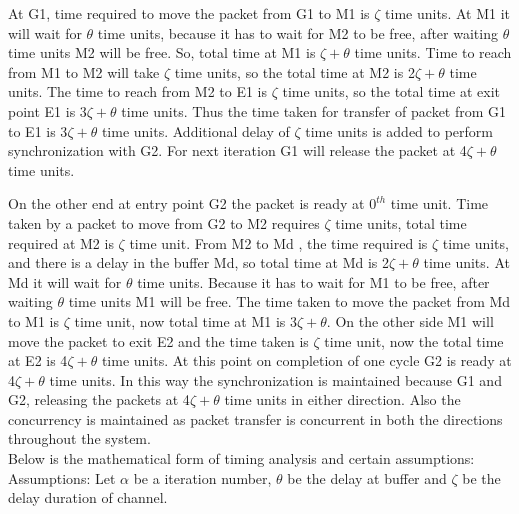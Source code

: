 \documentclass[letterpaper]{article}
\begin{document}
At G1, time required to move the packet from G1 to M1 is $\zeta$ time units. At M1 it will wait for $\theta$ time units, because it has to wait for M2 to be free, after waiting $\theta$ time units M2 will be  free. So, total time at M1 is $\zeta+\theta$ time units. Time to reach from M1 to M2 will take $\zeta$ time units, so the total time at M2 is 2$\zeta+\theta$ time units.  The time to reach from M2 to E1 is $\zeta$ time units, so the total time at exit point E1 is 3$\zeta+\theta$ time units. Thus the time taken for transfer of packet from G1 to E1 is 3$\zeta+\theta$ time units. Additional delay of $\zeta$ time units is added to perform synchronization with G2. For next iteration G1 will release the packet at 4$\zeta+\theta$ time units.
\par On the other end at entry point G2 the packet is ready at $0^{th}$ time unit. Time taken by a packet to move from G2 to M2 requires $\zeta$ time units, total time required at M2 is $\zeta$ time unit. From M2 to Md , the time required is $\zeta$ time units, and there is a delay in the buffer Md, so total time at Md is 2$\zeta+\theta$ time units. At Md it will wait for $\theta$ time units. Because it has to wait for M1 to be free, after waiting $\theta$ time units M1 will be  free. The time taken to move the packet from Md to M1 is $\zeta$ time unit, now total time at M1 is 3$\zeta+\theta$. On the other side M1 will move the packet to exit E2 and the time taken is $\zeta$ time unit, now the total time at E2 is 4$\zeta+\theta$ time units. At this point on completion of one cycle G2 is ready at 4$\zeta+\theta$ time units. In this way the synchronization is maintained because G1 and G2, releasing the packets at 4$\zeta+\theta$ time units in either direction. Also the concurrency is maintained as packet transfer is concurrent in both the directions throughout the system.\\
Below is the mathematical form of timing analysis and certain assumptions:\\
Assumptions: Let $\alpha$ be a iteration number, $\theta$ be the delay at buffer and $\zeta$ be the delay duration of channel. 
 
\end{document}
